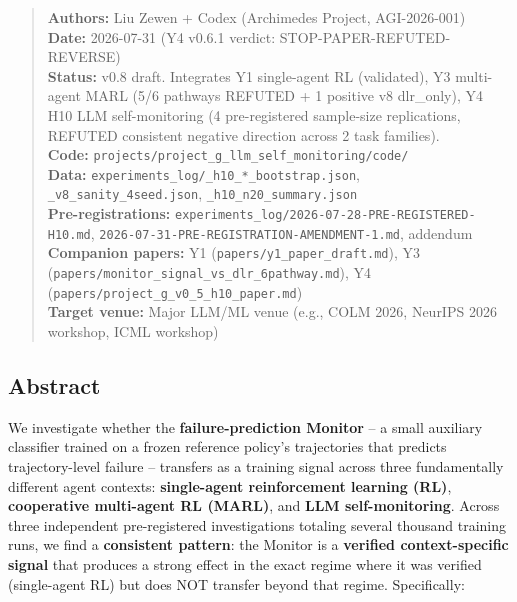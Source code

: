 \documentclass[
]{article}
\begin{document}
\begin{quote}
\textbf{Authors:} Liu Zewen + Codex (Archimedes Project, AGI-2026-001)\\
\textbf{Date:} 2026-07-31 (Y4 v0.6.1 verdict:
STOP-PAPER-REFUTED-REVERSE)\\
\textbf{Status:} v0.8 draft. Integrates Y1 single-agent RL (validated),
Y3 multi-agent MARL (5/6 pathways REFUTED + 1 positive v8 dlr\_only), Y4
H10 LLM self-monitoring (4 pre-registered sample-size replications,
REFUTED consistent negative direction across 2 task families).\\
\textbf{Code:}
\texttt{projects/project\_g\_llm\_self\_monitoring/code/}\\
\textbf{Data:} \texttt{experiments\_log/\_h10\_*\_bootstrap.json},
\texttt{\_v8\_sanity\_4seed.json}, \texttt{\_h10\_n20\_summary.json}\\
\textbf{Pre-registrations:}
\texttt{experiments\_log/2026-07-28-PRE-REGISTERED-H10.md},
\texttt{2026-07-31-PRE-REGISTRATION-AMENDMENT-1.md}, addendum\\
\textbf{Companion papers:} Y1 (\texttt{papers/y1\_paper\_draft.md}), Y3
(\texttt{papers/monitor\_signal\_vs\_dlr\_6pathway.md}), Y4
(\texttt{papers/project\_g\_v0\_5\_h10\_paper.md})\\
\textbf{Target venue:} Major LLM/ML venue (e.g., COLM 2026, NeurIPS 2026
workshop, ICML workshop)
\end{quote}

\subsection{Abstract}\label{abstract}

We investigate whether the \textbf{failure-prediction Monitor} -- a
small auxiliary classifier trained on a frozen reference policy's
trajectories that predicts trajectory-level failure -- transfers as a
training signal across three fundamentally different agent contexts:
\textbf{single-agent reinforcement learning (RL)}, \textbf{cooperative
multi-agent RL (MARL)}, and \textbf{LLM self-monitoring}. Across three
independent pre-registered investigations totaling several thousand
training runs, we find a \textbf{consistent pattern}: the Monitor is a
\textbf{verified context-specific signal} that produces a strong effect
in the exact regime where it was verified (single-agent RL) but does NOT
transfer beyond that regime. Specifically:
\end{document}
